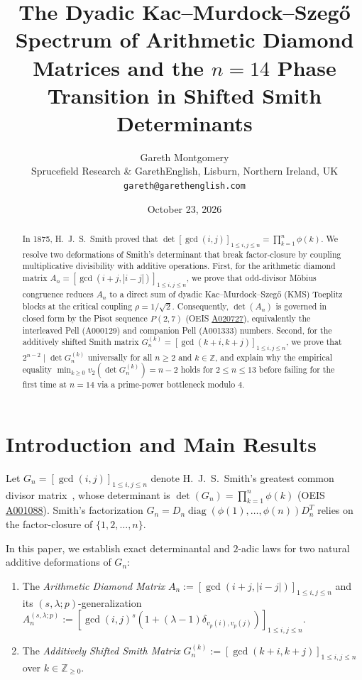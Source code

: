 \documentclass[12pt,reqno]{article}
\title{\textbf{The Dyadic Kac--Murdock--Szeg\H{o} Spectrum of Arithmetic Diamond Matrices and the $n=14$ Phase Transition in Shifted Smith Determinants}}
\author{Gareth Montgomery\\
\small Sprucefield Research \& GarethEnglish, Lisburn, Northern Ireland, UK\\
\small \texttt{gareth@garethenglish.com}}
\date{October 23, 2026}
\begin{document}
\maketitle

\begin{abstract}
In 1875, H.\ J.\ S.\ Smith proved that $\det[\gcd(i,j)]_{1\le i,j\le n} = \prod_{k=1}^n \phi(k)$. We resolve two deformations of Smith's determinant that break factor-closure by coupling multiplicative divisibility with additive operations. First, for the arithmetic diamond matrix $A_n = [\gcd(i+j, |i-j|)]_{1\le i,j\le n}$, we prove that odd-divisor Möbius congruence reduces $A_n$ to a direct sum of dyadic Kac--Murdock--Szeg\H{o} (KMS) Toeplitz blocks at the critical coupling $\rho = 1/\sqrt{2}$. Consequently, $\det(A_n)$ is governed in closed form by the Pisot sequence $P(2,7)$ (OEIS \href{https://oeis.org/A020727}{A020727}), equivalently the interleaved Pell (A000129) and companion Pell (A001333) numbers. Second, for the additively shifted Smith matrix $G_n^{(k)} = [\gcd(k+i, k+j)]_{1\le i,j\le n}$, we prove that $2^{n-2} \mid \det G_n^{(k)}$ universally for all $n\ge 2$ and $k\in\mathbb{Z}$, and explain why the empirical equality $\min_{k\ge 0} v_2(\det G_n^{(k)}) = n-2$ holds for $2\le n\le 13$ before failing for the first time at $n=14$ via a prime-power bottleneck modulo $4$.
\end{abstract}

\section{Introduction and Main Results}

Let $G_n = [\gcd(i,j)]_{1\le i,j\le n}$ denote H.\ J.\ S.\ Smith's greatest common divisor matrix~\cite{Smith1875}, whose determinant is $\det(G_n) = \prod_{k=1}^n \phi(k)$ (OEIS \href{https://oeis.org/A001088}{A001088}). Smith's factorization $G_n = D_n \operatorname{diag}(\phi(1),\dots,\phi(n)) D_n^T$ relies on the factor-closure of $\{1,2,\dots,n\}$.

In this paper, we establish exact determinantal and $2$-adic laws for two natural additive deformations of $G_n$:
\begin{enumerate}
    \item The \emph{Arithmetic Diamond Matrix} $A_n := [\gcd(i+j, |i-j|)]_{1\le i,j\le n}$ and its $(s,\lambda;p)$-generalization $A_n^{(s,\lambda;p)} := [\gcd(i,j)^s(1+(\lambda-1)\delta_{v_p(i),v_p(j)})]_{1\le i,j\le n}$.
    \item The \emph{Additively Shifted Smith Matrix} $G_n^{(k)} := [\gcd(k+i, k+j)]_{1\le i,j\le n}$ over $k\in\mathbb{Z}_{\ge 0}$.
\end{enumerate}
\end{document}

